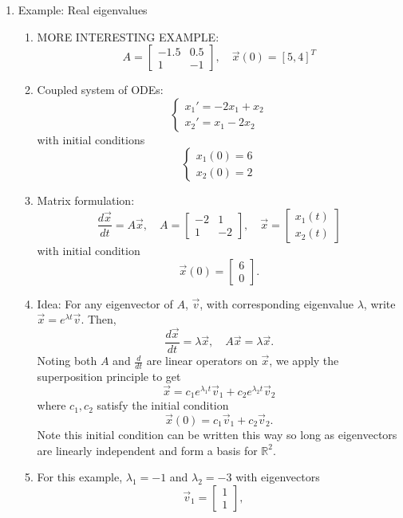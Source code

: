 \documentclass{article}
\begin{document}
\begin{enumerate}
\item Example: Real eigenvalues
\begin{enumerate}
\item MORE INTERESTING EXAMPLE:
\[
A = \left[ 
\begin{array}{cc}
-1.5 & 0.5 \\
1 & -1
\end{array}
\right], \quad 
\vec{x}(0)=[5,4]^T
\]
\item Coupled system of ODEs:
\[
\begin{cases}
x_1' = -2x_1 + x_2 \\
x_2' = x_1 - 2x_2 
\end{cases}
\]
with initial conditions
\[
\begin{cases}
x_1(0) = 6 \\
x_2(0) = 2 
\end{cases}
\]
\item Matrix formulation:
\[
\frac{d\vec{x}}{dt} = A \vec{x}, \quad A = \left[
\begin{array}{cc}
-2 & 1 \\ 1 & -2
\end{array} \right]
, \quad \vec{x} = \left[
\begin{array}{c}
x_1(t) \\ x_2(t)
\end{array}
\right]
\]
with initial condition
\[
\vec{x}(0) = \left[
\begin{array}{c}
6 \\ 0
\end{array}
\right].
\]
\item Idea: For any eigenvector of $A$, $\vec{v}$, with corresponding eigenvalue $\lambda$, write $\vec{x} = e^{\lambda t} \vec{v}$. Then,
\[
\frac{d \vec{x}}{dt} = \lambda \vec{x}, \quad A\vec{x} = \lambda \vec{x}.
\]
Noting both $A$ and $\frac{d}{dt}$ are linear operators on $\vec{x}$, we apply the superposition principle to get
\[
\vec{x} = c_1 e^{\lambda_1 t} \vec{v}_1 + c_2 e^{\lambda_2 t} \vec{v}_2
\]
where $c_1, c_2$ satisfy the initial condition
\[
\vec{x}(0) = c_1 \vec{v}_1 + c_2 \vec{v}_2.
\]
Note this initial condition can be written this way so long as eigenvectors are linearly independent and form a basis for $\mathbb{R}^2$. \item For this example, $\lambda_1=-1$ and $\lambda_2 = -3$ with eigenvectors
\[
\vec{v}_1 = \left[ \begin{array}{c}
1 \\ 1
\end{array} \right], \quad
\]
\end{enumerate}
\end{enumerate}
\end{document}
